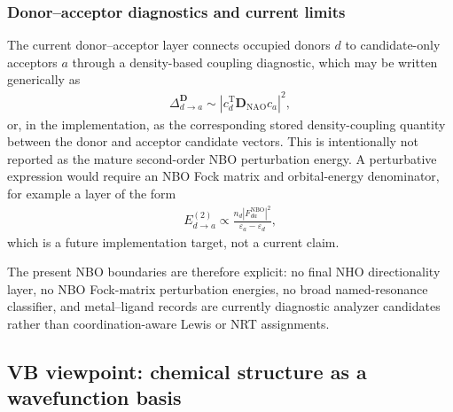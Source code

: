\documentclass[11pt]{article}
\newcommand{\nao}{\mathrm{NAO}}
\newcommand{\nbo}{\mathrm{NBO}}
\newcommand{\dens}{\mathbf{D}}
\begin{document}
\subsubsection*{Donor--acceptor diagnostics and current limits}

The current donor--acceptor layer connects occupied donors $d$ to candidate-only acceptors $a$ through a density-based coupling diagnostic, which may be written generically as
\begin{equation}
\begin{aligned}
	\Delta_{d\rightarrow a}^{\dens}
	\sim \left|c_d^{\mathrm{T}}\dens_{\nao}c_a\right|^2,
\end{aligned}
\end{equation}
or, in the implementation, as the corresponding stored density-coupling quantity between the donor and acceptor candidate vectors.  This is intentionally not reported as the mature second-order NBO perturbation energy.  A perturbative expression would require an NBO Fock matrix and orbital-energy denominator, for example a layer of the form
\begin{equation}
\begin{aligned}
	E_{d\rightarrow a}^{(2)}
	\propto
	\frac{n_d |F_{da}^{\nbo}|^2}{\varepsilon_a-\varepsilon_d},
\end{aligned}
\end{equation}
which is a future implementation target, not a current claim.

The present NBO boundaries are therefore explicit: no final NHO directionality layer, no NBO Fock-matrix perturbation energies, no broad named-resonance classifier, and metal--ligand records are currently diagnostic analyzer candidates rather than coordination-aware Lewis or NRT assignments.

\subsection{VB viewpoint: chemical structure as a wavefunction basis}
\end{document}
